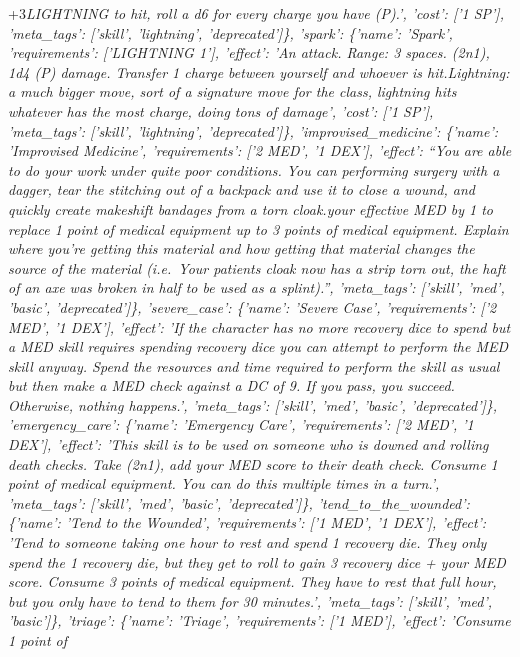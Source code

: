 \documentclass[
  letterpaper,
  DIV=11,
  numbers=noendperiod]{scrartcl}
\begin{document}
\n+3\emph{LIGHTNING to hit, roll a d6 for every charge you have (P).',
'cost': {[}'1 SP'{]}, 'meta\_tags': {[}'skill', 'lightning',
'deprecated'{]}\}, 'spark': \{'name': 'Spark', 'requirements':
{[}'LIGHTNING 1'{]}, 'effect': 'An attack. Range: 3 spaces. (2n1), 1d4
(P) damage. Transfer 1 charge between yourself and whoever is
hit.\nCall Lightning: a much bigger move, sort of a signature move for
the class, lightning hits whatever has the most charge, doing tons of
damage', 'cost': {[}'1 SP'{]}, 'meta\_tags': {[}'skill', 'lightning',
'deprecated'{]}\}, 'improvised\_medicine': \{'name': 'Improvised
Medicine', 'requirements': {[}'2 MED', '1 DEX'{]}, 'effect': ``You are
able to do your work under quite poor conditions. You can performing
surgery with a dagger, tear the stitching out of a backpack and use it
to close a wound, and quickly create makeshift bandages from a torn
cloak.\nLower your effective MED by 1 to replace 1 point of medical
equipment up to 3 points of medical equipment. Explain where you're
getting this material and how getting that material changes the source
of the material (i.e.~Your patients cloak now has a strip torn out, the
haft of an axe was broken in half to be used as a splint).'',
'meta\_tags': {[}'skill', 'med', 'basic', 'deprecated'{]}\},
'severe\_case': \{'name': 'Severe Case', 'requirements': {[}'2 MED', '1
DEX'{]}, 'effect': 'If the character has no more recovery dice to spend
but a MED skill requires spending recovery dice you can attempt to
perform the MED skill anyway. Spend the resources and time required to
perform the skill as usual but then make a MED check against a DC of 9.
If you pass, you succeed. Otherwise, nothing happens.', 'meta\_tags':
{[}'skill', 'med', 'basic', 'deprecated'{]}\}, 'emergency\_care':
\{'name': 'Emergency Care', 'requirements': {[}'2 MED', '1 DEX'{]},
'effect': 'This skill is to be used on someone who is downed and rolling
death checks. Take (2n1), add your MED score to their death check.
Consume 1 point of medical equipment. You can do this multiple times in
a turn.', 'meta\_tags': {[}'skill', 'med', 'basic', 'deprecated'{]}\},
'tend\_to\_the\_wounded': \{'name': 'Tend to the Wounded',
'requirements': {[}'1 MED', '1 DEX'{]}, 'effect': 'Tend to someone
taking one hour to rest and spend 1 recovery die. They only spend the 1
recovery die, but they get to roll to gain 3 recovery dice + your MED
score. Consume 3 points of medical equipment. They have to rest that
full hour, but you only have to tend to them for 30 minutes.',
'meta\_tags': {[}'skill', 'med', 'basic'{]}\}, 'triage': \{'name':
'Triage', 'requirements': {[}'1 MED'{]}, 'effect': 'Consume 1 point of
}
\end{document}
